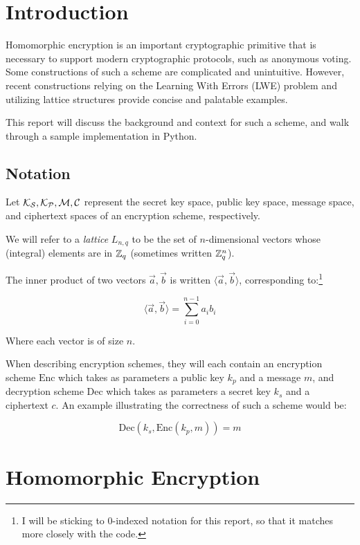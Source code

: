 \documentclass{theme}
\newcommand{\Enc}{\text{Enc}}
\newcommand{\Dec}{\text{Dec}}
\newcommand{\innerprod}[1]{\langle #1 \rangle}
\begin{document}
\section{Introduction}

Homomorphic encryption is an important cryptographic primitive that is necessary to support modern cryptographic protocols, such as anonymous voting. Some constructions of such a scheme are complicated and unintuitive. However, recent constructions relying on the Learning With Errors (LWE) problem and utilizing lattice structures provide concise and palatable examples.

This report will discuss the background and context for such a scheme, and walk through a sample implementation in Python.

\subsection{Notation}

Let $\mathcal{K_S}, \mathcal{K_P}, \mathcal{M}, \mathcal{C}$ represent the secret key space, public key space, message space, and ciphertext spaces of an encryption scheme, respectively.

We will refer to a \textit{lattice} $L_{n,q}$ to be the set of $n$-dimensional vectors whose (integral) elements are in $\mathbb{Z}_q$ (sometimes written $\mathbb{Z}_q^n$).

The inner product of two vectors $\vec{a}, \vec{b}$ is written $\innerprod{\vec{a}, \vec{b}}$, corresponding to:\footnote{I will be sticking to 0-indexed notation for this report, so that it matches more closely with the code.}

\begin{equation}
    \innerprod{\vec{a}, \vec{b}} = \sum_{i = 0}^{n - 1} a_i b_i
\end{equation}

Where each vector is of size $n$.

When describing encryption schemes, they will each contain an encryption scheme $\Enc$ which takes as parameters a public key $k_p$ and a message $m$, and decryption scheme $\Dec$ which takes as parameters a secret key $k_s$ and a ciphertext $c$. An example illustrating the correctness of such a scheme would be:

\begin{equation}
    \Dec(k_s, \Enc(k_p, m)) = m
\end{equation}

\section{Homomorphic Encryption}
\end{document}
